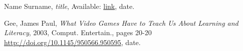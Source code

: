 %
%
%
\begin{thebibliography}{1}

  Name Surname,
  \emph{title},
  Available: \url{link},
  date.

  Gee, James Paul,
  \emph{What Video Games Have to Teach Us About Learning and Literacy},
  2003,
  Comput. Entertain., pages 20-20
  \url{http://doi.org/10.1145/950566.950595},
  date.
  
\end{thebibliography}